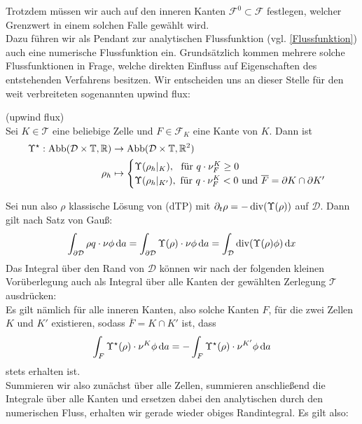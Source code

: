 Trotzdem müssen wir auch auf den inneren Kanten $ \mathcal{F}^0 \subset \mathcal{F} $ festlegen, welcher Grenzwert in einem solchen Falle gewählt wird. \\
Dazu führen wir als Pendant zur analytischen Flussfunktion (vgl. \ref{Flussfunktion})
auch eine numerische Flussfunktion ein. Grundsätzlich kommen mehrere solche Flussfunktionen in Frage, welche direkten Einfluss auf Eigenschaften des entstehenden Verfahrens besitzen. Wir entscheiden uns an dieser Stelle für den weit verbreiteten 
sogenannten upwind flux:
\begin{Definition}(upwind flux)\\
	Sei $K \in \mathcal{T}$ eine beliebige Zelle und $ F \in \mathcal{F}_K$ eine Kante von $K$. Dann ist
	\begin{align*}
		\Upsilon^{\star} : \text{Abb}(\mathcal{D}\times\mathbb{T},\mathbb{R}) &\to \text{Abb}(\mathcal{D}\times\mathbb{T},\mathbb{R}^2) \\
		\rho_h &\mapsto 
		\begin{cases}
			\Upsilon(\rho_h|_K) , \ \text{ für } q\cdot \nu_F^K \geq 0 \\  
			\Upsilon(\rho_h|_{K'}) ,\text{ für } q\cdot \nu_F^K < 0 \text{ und } \overline{F} = \partial K \cap \partial K'
		\end{cases}
	\end{align*}
\end{Definition}
Sei nun also $ \rho $ klassische Lösung von (dTP) mit $ \partial_t \rho = -\operatorname{div}(\Upsilon(\rho)) $ auf $ \mathcal{D} $. Dann gilt nach Satz von Gauß:
\begin{align}
		\label{gaus1}
		\int_{\partial \mathcal{D}} \rho q \cdot  \nu \phi \, \mathrm{d} a  =\int_{\partial \mathcal{D}} \Upsilon(\rho) \cdot \nu \phi \, \mathrm{d} a = \int_{\mathcal{D}} \operatorname{div} (\Upsilon(\rho)\phi) \, \mathrm{d} x
\end{align}
Das Integral über den Rand von $ \mathcal{D} $ können wir nach der folgenden kleinen Vorüberlegung auch als Integral über alle Kanten der gewählten Zerlegung $ \mathcal{T} $ ausdrücken: \\
Es gilt nämlich für alle inneren Kanten, also solche Kanten $ F $, für die zwei Zellen $ K $ und $ K' $ existieren, sodass $ \overline{F} = K \cap K' $ ist, dass \[ \int_F \Upsilon^{\star}(\rho) \cdot \nu^K \phi \, \mathrm{d} a = - \int_F \Upsilon^{\star}(\rho) \cdot \nu^{K'} \phi \, \mathrm{d} a \] stets erhalten ist. \\
Summieren wir also zunächst über alle Zellen, summieren anschließend die Integrale über alle Kanten und ersetzen dabei den analytischen durch den numerischen Fluss, erhalten wir gerade wieder obiges Randintegral. Es gilt also:
